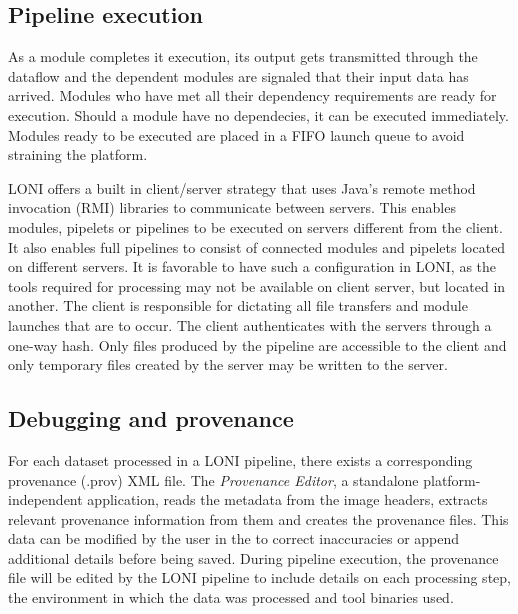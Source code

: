 \documentclass{report}
\begin{document}
        \subsection{Pipeline execution} As a module completes it execution, its
        output gets transmitted through the dataflow and the dependent modules
        are signaled that their input data has arrived.  Modules who have met
        all their dependency requirements are ready for execution.  Should a
        module have no dependecies, it can be executed immediately. Modules
        ready to be executed are placed in a FIFO launch queue to avoid
        straining the platform. 

       LONI offers a built in client/server strategy that uses Java's remote
       method invocation (RMI) libraries to communicate between servers. This
       enables modules, pipelets or pipelines to be executed on servers
       different from the client. It also enables full pipelines to consist of
       connected modules and pipelets located on different servers. It is
       favorable to have such a configuration in LONI, as the tools required for
       processing may not be available on client server, but located in another.
       The client is responsible for dictating all file transfers and module
       launches that are to occur. The client authenticates with the servers
       through a one-way hash. Only files produced by the pipeline are
       accessible to the client and only temporary files created by the server
       may be written to the server.

        \subsection{Debugging and provenance} For each dataset processed in a
        LONI pipeline, there exists a corresponding provenance (.prov) XML file.
        The \textit{Provenance Editor}, a standalone platform-independent
        application, reads the metadata from the image headers, extracts
        relevant provenance information from them and creates the provenance
        files.  This data can be modified by the user in the to correct
        inaccuracies or append additional details before being saved. During
        pipeline execution, the provenance file will be edited by the LONI
        pipeline to include details on each processing step, the environment in
        which the data was processed and tool binaries used. 
\end{document}
